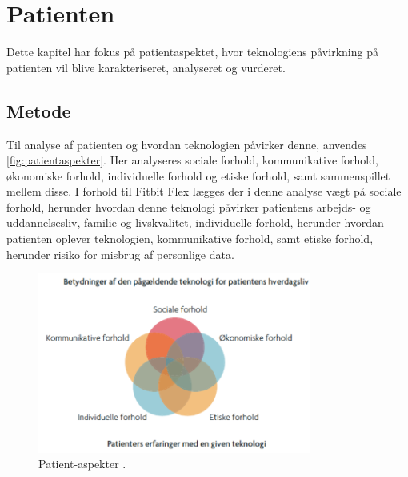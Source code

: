 \chapter{Patienten}
Dette kapitel har fokus på patientaspektet, hvor teknologiens påvirkning på patienten vil blive karakteriseret, analyseret og vurderet. 
\section{Metode}
Til analyse af patienten og hvordan teknologien påvirker denne, anvendes \autoref{fig:patientaspekter}. Her analyseres sociale forhold, kommunikative forhold, økonomiske forhold, individuelle forhold og etiske forhold, samt sammenspillet mellem disse. I forhold til Fitbit Flex lægges der i denne analyse vægt på sociale forhold, herunder hvordan denne teknologi påvirker patientens arbejds- og uddannelsesliv, familie og livskvalitet, individuelle forhold, herunder hvordan patienten oplever teknologien, kommunikative forhold, samt etiske forhold, herunder risiko for misbrug af personlige data. 


\begin{figure}[H]
\centering
\includegraphics[width=0.8\textwidth]{figures/patientaspekter}
\caption{Patient-aspekter \citep{mtvhaandbog}.}
\label{fig:patientaspekter}
\end{figure}

